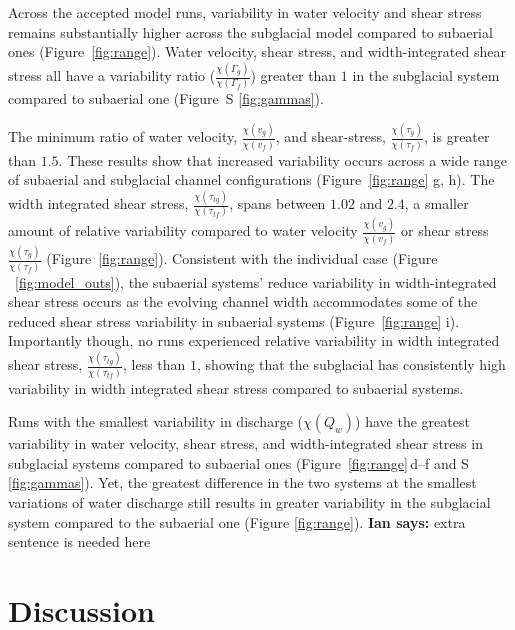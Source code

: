\documentclass[11pt]{article}
\newcommand{\ian}[1]{{\textbf{\color{blue}Ian says:} \color{blue} #1} }
\begin{document}
\begin{spacing}{1}
  Across the accepted model runs, variability in water velocity and shear stress remains substantially higher across the subglacial model compared to subaerial ones (Figure~\ref{fig:range}).
  Water velocity, shear stress, and width-integrated shear stress all have a variability ratio ($\frac{\chi(\Gamma_{g})}{\chi(\Gamma_f)}$) greater than $1$ in the subglacial  system compared to subaerial one (Figure~S \ref{fig:gammas}).
  
  The minimum ratio of  water velocity, $\frac{\chi(v_{g})}{\chi(v_{f})}$, and shear-stress, $\frac{\chi(\tau_{g})}{\chi(\tau_{f})}$, is greater than $1.5$.
  These results show that increased variability occurs across a wide range of subaerial and subglacial channel configurations (Figure~\ref{fig:range} g, h).
The width integrated shear stress, $\frac{\chi(\tau_{tg})}{\chi( \tau_{tf})}$, spans between $1.02$ and $2.4$, a smaller amount of relative variability compared to  water velocity $\frac{\chi(v_{g})}{\chi(v_{f})}$ or shear stress $\frac{\chi(\tau_{g})}{\chi(\tau_{f})}$ (Figure~\ref{fig:range}).
Consistent with the individual case (Figure ~\ref{fig:model_outs}), the subaerial systems' reduce variability in width-integrated shear stress occurs  as the evolving channel width accommodates some of the reduced shear stress variability in subaerial systems (Figure~\ref{fig:range} i).
  Importantly though, no runs experienced relative variability in width integrated shear stress, $\frac{\chi(\tau_{tg})}{\chi( \tau_{tf})}$, less than $1$, showing that the subglacial has consistently high variability in width integrated shear stress compared to subaerial systems.
  
  Runs with the smallest variability in discharge ($\chi(Q_w)$) have the greatest variability in water velocity, shear stress, and width-integrated shear stress in subglacial systems compared to subaerial ones (Figure~\ref{fig:range}\,d--f and S \ref{fig:gammas}).
  Yet, the greatest difference in the two systems at the smallest variations of water discharge still results in greater variability in the subglacial system compared to the subaerial one (Figure \ref{fig:range}). 
\ian{extra sentence is needed here}
  
  \section{Discussion}


\end{spacing}
\end{document}

